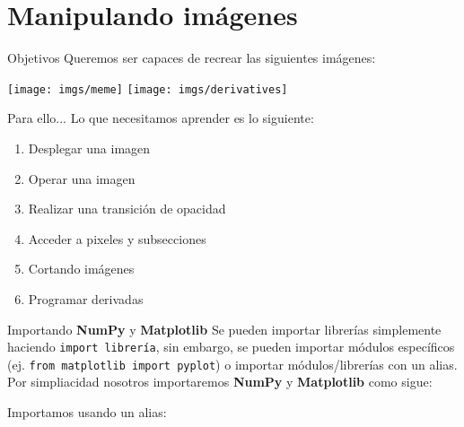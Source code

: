 \documentclass[usenames,dvipsnames]{beamer}
\begin{document}
  \section{Manipulando imágenes}
  \begin{frame}{Objetivos}
    Queremos ser capaces de recrear las siguientes imágenes:
    \begin{center}
      \texttt{[image: imgs/meme]}\hspace{0.1cm}
      \texttt{[image: imgs/derivatives]}
    \end{center}
  \end{frame}

  \begin{frame}{Para ello...}
    Lo que necesitamos aprender es lo siguiente:
    \vspace*{0.5cm}
    \begin{enumerate}
      \item Desplegar una imagen
      \item Operar una imagen
      \item Realizar una transición de opacidad
      \item Acceder a pixeles y subsecciones
      \item Cortando imágenes
      \item Programar derivadas
    \end{enumerate}
  \end{frame}

  \begin{frame}{Importando \textbf{NumPy} y \textbf{Matplotlib}}
    Se pueden importar librerías simplemente haciendo \texttt{import librería},
    sin embargo, se pueden importar módulos específicos (ej. \texttt{from
    matplotlib import pyplot}) o importar módulos/librerías con un alias.\\
    \vspace*{0.3cm}
    Por simpliacidad nosotros importaremos \textbf{NumPy} y \textbf{Matplotlib}
    como sigue:
    \vspace*{0.3cm}
    \begin{block}{Importamos usando un alias:}
      \\
      \\
      \vspace*{0.5cm}
    \end{block}
  \end{frame}
\end{document}
